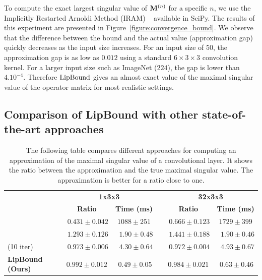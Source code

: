 To compute the exact largest singular value of $\mathbf{M}^{(n)}$ for a specific $n$, we use the Implicitly Restarted Arnoldi Method (IRAM) ~\cite{lehoucq1996deflation} available in SciPy.
The results of this experiment are presented in Figure~\ref{figure:convergence_bound}.
We observe that the difference between the bound and the actual value (approximation gap) quickly decreases as the input size increases.
For an input size of $50$, the approximation gap is as low as $0.012$ using a standard $6\times3\times3$ convolution kernel.
For a larger input size such as ImageNet ($224$), the gap is lower than $4.10^{-4}$.
Therefore $\operatorname{LipBound}$ gives an almost exact value of the maximal singular value of the operator matrix for most realistic settings.

\subsection{Comparison of LipBound with other state-of-the-art approaches} \label{subsection:comparaison_sota}

\begin{table}[ht]
  \centering
  \caption{The following table compares different approaches for computing an approximation of the maximal singular value of a convolutional layer. It shows the ratio between the approximation and the true maximal singular value. The approximation is better for a ratio close to one.}
  {\footnotesize
    \begin{tabular}{lrccrcc}
    \toprule
      &   & \multicolumn{2}{c}{\textbf{1x3x3}} &   & \multicolumn{2}{c}{\textbf{32x3x3}} \\
    \cmidrule{3-4}\cmidrule{6-7}  &   & \textbf{Ratio} & \textbf{Time (ms)} &   & \textbf{Ratio} & \textbf{Time (ms)} \\
    \midrule
    \citeauthor{sedghi2018iclr} &   & $\phantom{.}0.431\pm0.042$ & $1088\pm251$ &   & $\phantom{.}0.666\pm0.123$ & $1729\pm399$ \\
    \citeauthor{singla2019bounding} &   & $\phantom{.}1.293\pm0.126$ & $\phantom{..}1.90\pm0.48$ &   & $\phantom{.}1.441\pm0.188$ & $\phantom{..}1.90\pm0.46$ \\
    \citeauthor{farnia2018generalizable} (10 iter) &   & $\phantom{.}0.973\pm0.006$ & $\phantom{..}4.30\pm0.64$ &   & $\phantom{.}0.972\pm0.004$ & $\phantom{..}4.93\pm0.67$ \\
    \midrule
    \midrule
    \textbf{LipBound (Ours)} &   & $\mathbf{0.992}\pm0.012$ & $\phantom{.}\mathbf{0.49}\pm0.05$ &   & $\mathbf{0.984}\pm0.021$ & $\phantom{.}\mathbf{0.63}\pm0.46$ \\
    \bottomrule
    \end{tabular}%
  }
  \label{table:comparaison}%
\end{table}



